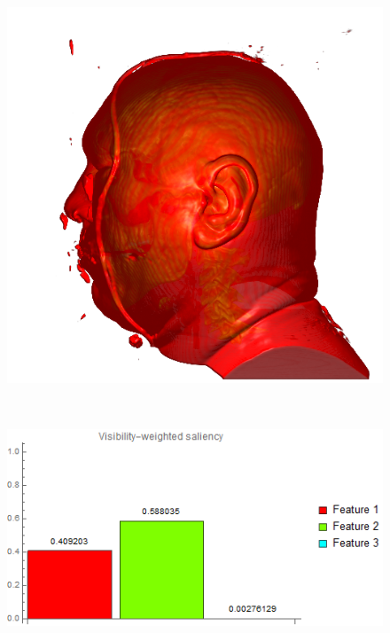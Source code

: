 \begin{figure}
\begin{minipage}{.24\textwidth}
		\includegraphics[width=1\linewidth]{images/vismale_strong_red}
		\subcaption{}
	\end{minipage}~
	\begin{minipage}{.25\textwidth}
		\includegraphics[width=1\linewidth]{images/vismale_strong_red_visibility_saliency_weighted_chart}
		\subcaption{}
	\end{minipage}~
	\begin{minipage}{.24\textwidth}

\end{minipage}
\end{figure}
